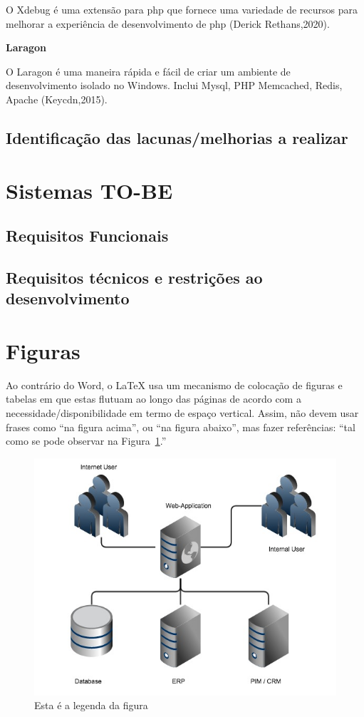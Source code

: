 \quad O Xdebug é uma extensão para \acrshort{php} que fornece uma variedade de recursos para melhorar a experiência de desenvolvimento de \acrshort{php} (Derick Rethans,2020).\newline


\textbf{Laragon}

O Laragon é uma maneira rápida e fácil de criar um ambiente de desenvolvimento isolado no Windows. Inclui Mysql, PHP Memcached, Redis, Apache (Keycdn,2015).\newline

\subsection{Identificação das lacunas/melhorias a realizar}
\section{Sistemas TO-BE}
\subsection{Requisitos Funcionais}
\subsection{Requisitos técnicos e restrições ao desenvolvimento}






\section{Figuras}

Ao contrário do Word, o \LaTeX{} usa um mecanismo de colocação de figuras e tabelas em que estas
flutuam ao longo das páginas de acordo com a necessidade/disponibilidade em termo de espaço vertical.
Assim, não devem usar frases como ``na figura acima'', ou ``na figura abaixo'', mas fazer referências:
``tal como se pode observar na Figura~\ref{fig:1}.''

\begin{figure}[htb]
    \centering
    \includegraphics[width=0.8\linewidth]{images/sample}  %
    \caption{Esta é a legenda da figura}
    \label{fig:1}
\end{figure}


